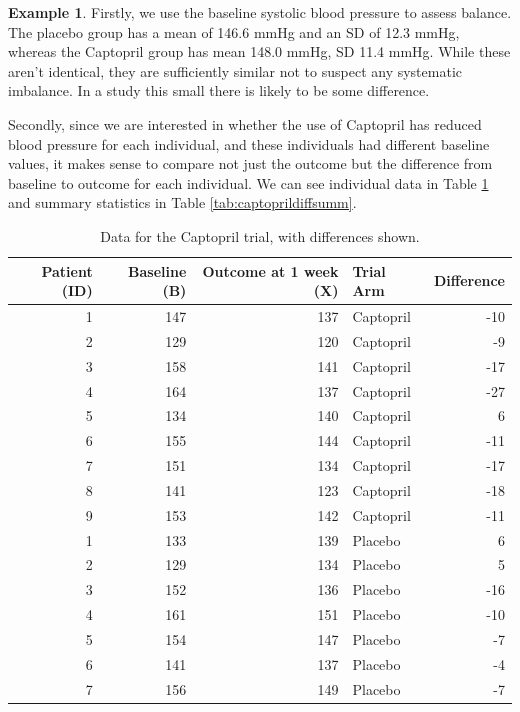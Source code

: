 \documentclass[
  openany]{book}
\theoremstyle{definition}
\theoremstyle{definition}
\newtheorem{example}{Example}[chapter]
\theoremstyle{definition}
\theoremstyle{definition}
\theoremstyle{remark}
\begin{document}
\begin{example}
Firstly, we use the baseline systolic blood pressure to assess balance. The placebo group has a mean of 146.6 mmHg and an SD of 12.3 mmHg, whereas the Captopril group has mean 148.0 mmHg, SD 11.4 mmHg. While these aren't identical, they are sufficiently similar not to suspect any systematic imbalance. In a study this small there is likely to be some difference.

Secondly, since we are interested in whether the use of Captopril has reduced blood pressure for each individual, and these individuals had different baseline values, it makes sense to compare not just the outcome but the difference from baseline to outcome for each individual. We can see individual data in Table \ref{tab:captoprildiff} and summary statistics in Table \ref{tab:captoprildiffsumm}.

\begin{table}

\caption{\label{tab:captoprildiff}Data for the Captopril trial, with differences shown.}
\centering
\begin{tabular}[t]{r|r|r|l|r}
\hline
Patient (ID) & Baseline (B) & Outcome at 1 week (X) & Trial Arm & Difference\\
\hline
1 & 147 & 137 & Captopril & -10\\
\hline
2 & 129 & 120 & Captopril & -9\\
\hline
3 & 158 & 141 & Captopril & -17\\
\hline
4 & 164 & 137 & Captopril & -27\\
\hline
5 & 134 & 140 & Captopril & 6\\
\hline
6 & 155 & 144 & Captopril & -11\\
\hline
7 & 151 & 134 & Captopril & -17\\
\hline
8 & 141 & 123 & Captopril & -18\\
\hline
9 & 153 & 142 & Captopril & -11\\
\hline
1 & 133 & 139 & Placebo & 6\\
\hline
2 & 129 & 134 & Placebo & 5\\
\hline
3 & 152 & 136 & Placebo & -16\\
\hline
4 & 161 & 151 & Placebo & -10\\
\hline
5 & 154 & 147 & Placebo & -7\\
\hline
6 & 141 & 137 & Placebo & -4\\
\hline
7 & 156 & 149 & Placebo & -7\\
\hline
\end{tabular}
\end{table}


\end{example}
\end{document}
